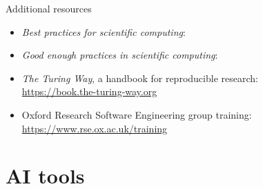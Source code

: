\documentclass[aspectratio=169]{beamer}
\begin{document}
\begin{frame}{Additional resources}
  \begin{itemize}
    \item \emph{Best practices for scientific computing}:\\
    \item \emph{Good enough practices in scientific computing}:\\
    \item \emph{The Turing Way}, a handbook for reproducible research:\\
      \url{https://book.the-turing-way.org}
    \item Oxford Research Software Engineering group training:\\
      \url{https://www.rse.ox.ac.uk/training}
  \end{itemize}
  \note[item]{} %
\end{frame}

\section{AI tools}
\end{document}
